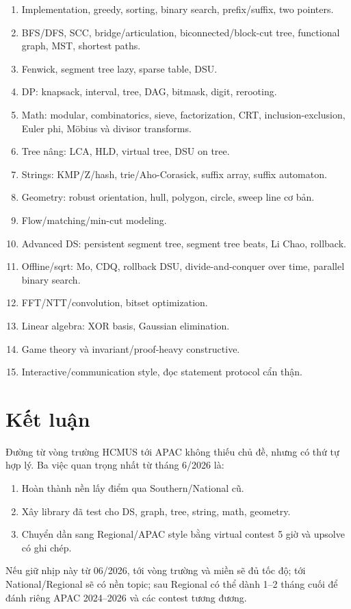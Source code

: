 \documentclass[11pt,a4paper]{article}
\begin{document}
\begin{enumerate}
  \item Implementation, greedy, sorting, binary search, prefix/suffix, two pointers.
  \item BFS/DFS, SCC, bridge/articulation, biconnected/block-cut tree, functional graph, MST, shortest paths.
  \item Fenwick, segment tree lazy, sparse table, DSU.
  \item DP: knapsack, interval, tree, DAG, bitmask, digit, rerooting.
  \item Math: modular, combinatorics, sieve, factorization, CRT, inclusion-exclusion, Euler phi, Möbius và divisor transforms.
  \item Tree nâng: LCA, HLD, virtual tree, DSU on tree.
  \item Strings: KMP/Z/hash, trie/Aho-Corasick, suffix array, suffix automaton.
  \item Geometry: robust orientation, hull, polygon, circle, sweep line cơ bản.
  \item Flow/matching/min-cut modeling.
  \item Advanced DS: persistent segment tree, segment tree beats, Li Chao, rollback.
  \item Offline/sqrt: Mo, CDQ, rollback DSU, divide-and-conquer over time, parallel binary search.
  \item FFT/NTT/convolution, bitset optimization.
  \item Linear algebra: XOR basis, Gaussian elimination.
  \item Game theory và invariant/proof-heavy constructive.
  \item Interactive/communication style, đọc statement protocol cẩn thận.
\end{enumerate}

\section{Kết luận}

Đường từ vòng trường HCMUS tới APAC không thiếu chủ đề, nhưng có thứ tự hợp lý. Ba việc quan trọng nhất từ tháng 6/2026 là:

\begin{enumerate}
  \item Hoàn thành nền lấy điểm qua Southern/National cũ.
  \item Xây library đã test cho DS, graph, tree, string, math, geometry.
  \item Chuyển dần sang Regional/APAC style bằng virtual contest 5 giờ và upsolve có ghi chép.
\end{enumerate}

Nếu giữ nhịp này từ 06/2026, tới vòng trường và miền sẽ đủ tốc độ; tới National/Regional sẽ có nền topic; sau Regional có thể dành 1--2 tháng cuối để đánh riêng APAC 2024--2026 và các contest tương đương.
\end{document}
